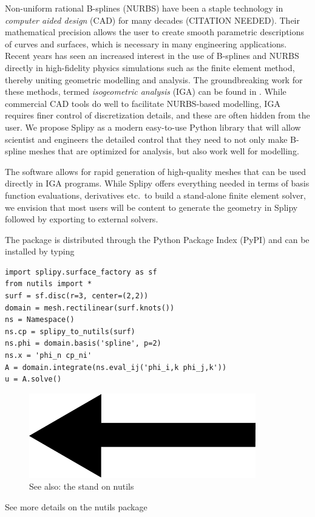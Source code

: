\documentclass[landscape]{sintefposter}
\begin{document}
\begin{multicols}{3}
Non-uniform rational B-splines (NURBS) have been a staple technology in \emph{computer aided design} (CAD) for many decades (CITATION NEEDED).
Their mathematical precision allows the user to create smooth parametric descriptions of curves and surfaces, which is necessary in many engineering applications.
Recent years has seen an increased interest in the use of B-splines and NURBS directly in high-fidelity physics simulations such as the finite element method, thereby uniting geometric modelling and analysis.
The groundbreaking work for these methods, termed \emph{isogeometric analysis} (IGA) can be found in \cite{hughes2005iac}.
While commercial CAD tools do well to facilitate NURBS-based modelling, IGA requires finer control of discretization details, and these are often hidden from the user.
We propose Splipy as a modern easy-to-use Python library that will allow scientist and engineers the detailed control that they need to not only make B-spline meshes that are optimized for analysis, but also work well for modelling.

The software allows for rapid generation of high-quality meshes that can be used directly in IGA programs.
While Splipy offers everything needed in terms of basis function evaluations, derivatives etc.~to build a stand-alone finite element solver, we envision that most users will be content to generate the geometry in Splipy followed by exporting to external solvers.

\begin{tcolorbox}[colback=white,colframe=sintefblue,title=Integration with Nutils]
  The package is distributed through the Python Package Index (PyPI) and can be installed by typing
  \begin{tcolorbox}[colback=sinteflightgrey]
  \begin{verbatim}
import splipy.surface_factory as sf
from nutils import *
surf = sf.disc(r=3, center=(2,2))
domain = mesh.rectilinear(surf.knots())
ns = Namespace()
ns.cp = splipy_to_nutils(surf)
ns.phi = domain.basis('spline', p=2)
ns.x = 'phi_n cp_ni'
A = domain.integrate(ns.eval_ij('phi_i,k phi_j,k'))
u = A.solve() \end{verbatim}
  \end{tcolorbox}
  \begin{figure}
    \begin{center}
      \includegraphics[width=0.4\linewidth]{left.png} \\
      See also: the stand on nutils
    \end{center}
  \end{figure}
\end{tcolorbox}
See more details on the nutils package



\end{multicols}
\end{document}
